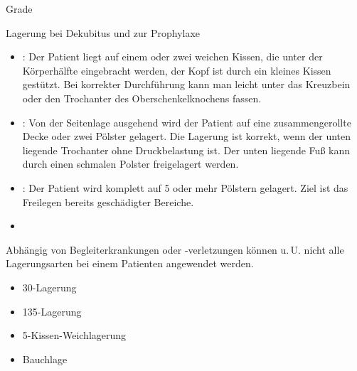 {Grade}
{}
{}
{}
{}
{}

{Lagerung bei Dekubitus und zur Prophylaxe}
{
\begin{itemize}
  \item {}: Der Patient liegt auf
  einem oder zwei weichen Kissen, die unter der Körperhälfte
  eingebracht werden, der Kopf ist durch ein kleines Kissen
  gestützt. Bei korrekter Durchführung kann man leicht unter
  das Kreuzbein oder den Trochanter des Oberschenkelknochens
  fassen. \cite{ThiemesPflege12}
  \item {}: 
  Von der Seitenlage ausgehend wird der Patient auf eine
  zusammengerollte Decke oder zwei Pölster gelagert. Die
  Lagerung ist korrekt, wenn der unten liegende Trochanter
  ohne Druckbelastung ist. Der unten liegende Fuß kann
  durch einen schmalen Polster freigelagert werden.
  \cite{WundversorgungPflege2}
  
  \item {}: Der Patient wird komplett
  auf 5 oder mehr Pölstern gelagert. Ziel ist das Freilegen
  bereits geschädigter Bereiche. \cite{ThiemesPflege12}
  \item {}
\end{itemize}
Abhängig von Begleiterkrankungen oder -verletzungen können
u.\,U. nicht alle Lagerungsarten bei einem Patienten
angewendet werden.
}
{
\begin{itemize}
  \item {30\textdegree{}-Lagerung}
  \item {135\textdegree{}-Lagerung}
  \item {5-Kissen-Weichlagerung}
  \item {Bauchlage}
\end{itemize}

 }
{}
{}
{}

